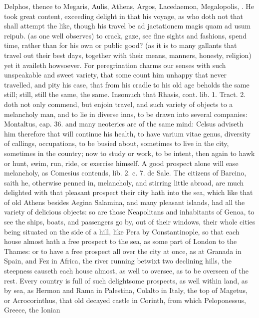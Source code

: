 {Delphos, thence to Megaris, Aulis, Athens, Argos, Lacedaemon,
Megalopolis, \etc{}. He took great content, exceeding delight in that his
voyage, as who doth not that shall attempt the like, though his travel
be ad jactationem magis quam ad usum reipub. (as one well
observes) to crack, gaze, see fine sights and fashions, spend time,
rather than for his own or public good? (as it is to many gallants that
travel out their best days, together with their means, manners,
honesty, religion) yet it availeth howsoever. For peregrination charms
our senses with such unspeakable and sweet variety, that some
count him unhappy that never travelled, and pity his case, that from
his cradle to his old age beholds the same still; still, still the
same, the same. Insomuch that Rhasis, cont. lib. 1. Tract. 2.
doth not only commend, but enjoin travel, and such variety of objects
to a melancholy man, and to lie in diverse inns, to be drawn into
several companies: Montaltus, cap. 36. and many neoterics are of the
same mind: Celsus adviseth him therefore that will continue his health,
to have varium vitae genus, diversity of callings, occupations, to be
busied about,  sometimes to live in the city, sometimes in the
country; now to study or work, to be intent, then again to hawk or
hunt, swim, run, ride, or exercise himself. A good prospect alone will
ease melancholy, as Comesius contends, lib. 2. c. 7. de Sale. The
citizens of Barcino, saith he, otherwise penned in, melancholy,
and stirring little abroad, are much delighted with that pleasant
prospect their city hath into the sea, which like that of old Athens
besides Aegina Salamina, and many pleasant islands, had all the variety
of delicious objects: so are those Neapolitans and inhabitants of
Genoa, to see the ships, boats, and passengers go by, out of their
windows, their whole cities being situated on the side of a hill, like
Pera by Constantinople, so that each house almost hath a free prospect
to the sea, as some part of London to the Thames: or to have a free
prospect all over the city at once, as at Granada in Spain, and Fez in
Africa, the river running betwixt two declining hills, the steepness
causeth each house almost, as well to oversee, as to be overseen of the
rest. Every country is full of such delightsome prospects, as
well within land, as by sea, as Hermon and Rama in Palestina,
Colalto in Italy, the top of Magetus, or Acrocorinthus, that old
decayed castle in Corinth, from which Peloponessus, Greece, the Ionian
}
